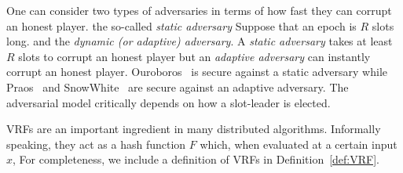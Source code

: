 One can consider two types of adversaries in terms of 
how fast they can corrupt an honest player. the so-called \emph{static adversary} 
Suppose that an epoch is $R$ slots long. 
and the \emph{dynamic (or adaptive) adversary}. 
A \emph{static adversary} takes at least $R$ slots to corrupt an honest player 
but an \emph{adaptive adversary} can instantly corrupt an honest player. 
Ouroboros~\cite {Ouroboros} is secure against a static adversary 
while Praos~\cite {Praos} and SnowWhite~\cite{SnowWhite} 
are secure against an adaptive adversary.
The adversarial model critically depends on how a slot-leader is elected. 



VRFs are an important ingredient in many distributed algorithms. 
Informally speaking, they act as a hash function $F$ which, when evaluated at a certain input $x$, 
For completeness, we include a definition of VRFs in
Definition~\ref{def:VRF}.




